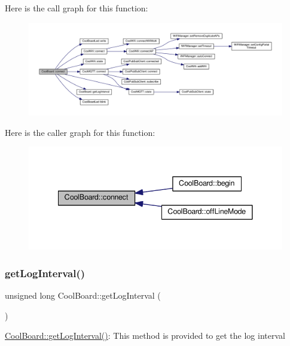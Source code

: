 Here is the call graph for this function\+:\nopagebreak
\begin{figure}[H]
\begin{center}
\leavevmode
\includegraphics[width=350pt]{d7/df9/class_cool_board_a519de78b807f8ec6463ff484eb925918_cgraph}
\end{center}
\end{figure}
Here is the caller graph for this function\+:\nopagebreak
\begin{figure}[H]
\begin{center}
\leavevmode
\includegraphics[width=341pt]{d7/df9/class_cool_board_a519de78b807f8ec6463ff484eb925918_icgraph}
\end{center}
\end{figure}
\mbox{\label{class_cool_board_a7508e029f2ee17bb747ffab599285e0d}} 
\subsubsection{\texorpdfstring{get\+Log\+Interval()}{getLogInterval()}}
{\footnotesize\ttfamily unsigned long Cool\+Board\+::get\+Log\+Interval (\begin{DoxyParamCaption}{ }\end{DoxyParamCaption})}

\hyperlink{class_cool_board_a7508e029f2ee17bb747ffab599285e0d}{Cool\+Board\+::get\+Log\+Interval()}\+: This method is provided to get the log interval

